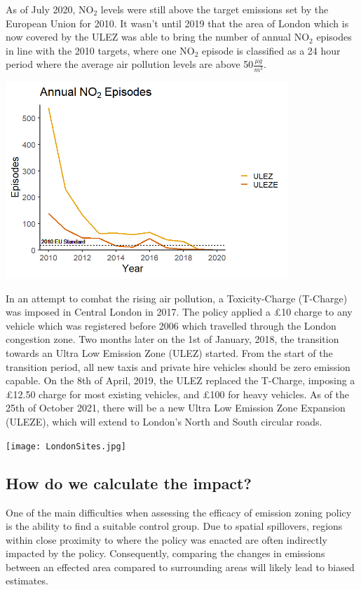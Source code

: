 \documentclass[
]{article}
\begin{document}
As of July 2020, NO\(_2\) levels were still above the target emissions
set by the European Union for 2010. It wasn't until 2019 that the area
of London which is now covered by the ULEZ was able to bring the number
of annual NO\(_2\) episodes in line with the 2010 targets, where one
NO\(_2\) episode is classified as a 24 hour period where the average air
pollution levels are above 50\(\frac{\mu g}{m^3}\).

\includegraphics[width=0.8\textwidth,height=\textheight]{NO2Episodes.png}

In an attempt to combat the rising air pollution, a Toxicity-Charge
(T-Charge) was imposed in Central London in 2017. The policy applied a
£10 charge to any vehicle which was registered before 2006 which
travelled through the London congestion zone. Two months later on the
1st of January, 2018, the transition towards an Ultra Low Emission Zone
(ULEZ) started. From the start of the transition period, all new taxis
and private hire vehicles should be zero emission capable. On the 8th of
April, 2019, the ULEZ replaced the T-Charge, imposing a £12.50 charge
for most existing vehicles, and £100 for heavy vehicles. As of the 25th
of October 2021, there will be a new Ultra Low Emission Zone Expansion
(ULEZE), which will extend to London's North and South circular roads.

\texttt{[image: LondonSites.jpg]}

\hypertarget{how-do-we-calculate-the-impact}{%
\subsection{How do we calculate the
impact?}\label{how-do-we-calculate-the-impact}}

One of the main difficulties when assessing the efficacy of emission
zoning policy is the ability to find a suitable control group. Due to
spatial spillovers, regions within close proximity to where the policy
was enacted are often indirectly impacted by the policy. Consequently,
comparing the changes in emissions between an effected area compared to
surrounding areas will likely lead to biased estimates.
\end{document}
